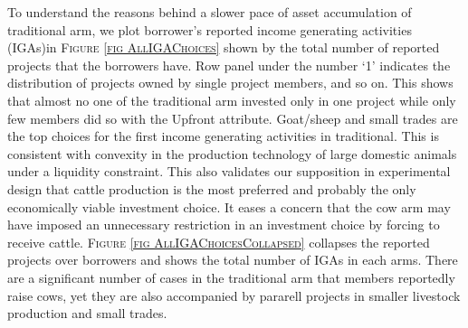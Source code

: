 	To understand the reasons behind a slower pace of asset accumulation of \textsf{traditional} arm, we plot borrower's reported income generating activities (IGAs)in \textsc{\small Figure \ref{fig AllIGAChoices}} shown by the total number of reported projects that the borrowers have. Row panel under the number `1' indicates the distribution of projects owned by single project members, and so on. This shows that almost no one of the \textsf{traditional} arm invested only in one project while only few members did so with the \textsf{Upfront} attribute. Goat/sheep and small trades are the top choices for the first income generating activities in \textsf{traditional}. This is consistent with convexity in the production technology of large domestic animals under a liquidity constraint. This also validates our supposition in experimental design that cattle production is the most preferred and probably the only economically viable investment choice. It eases a concern that the \textsf{cow} arm may have imposed an unnecessary restriction in an investment choice by forcing to receive cattle. \textsc{\small Figure \ref{fig AllIGAChoicesCollapsed}} collapses the reported projects over borrowers and shows the total number of IGAs in each arms. There are a significant number of cases in the \textsf{traditional} arm that members reportedly raise cows, yet they are also accompanied by pararell projects in smaller livestock production and small trades. 

\begin{figure}
\end{figure}

